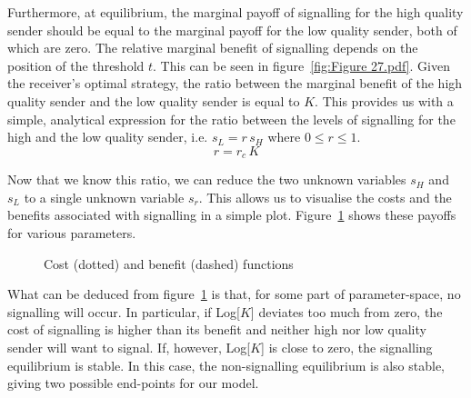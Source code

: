 \documentclass[a4paper,12pt]{article}
\numberwithin{equation}{section}
\begin{document}
Furthermore, at equilibrium, the marginal payoff of signalling for the high quality sender should be equal to the marginal payoff for the low quality sender, both of which are zero. The relative marginal benefit of signalling depends on the position of the threshold $t$. This can be seen in figure~\ref{fig:Figure 27.pdf}. Given the receiver's optimal strategy, the ratio between the marginal benefit of the high quality sender and the low quality sender is equal to $K$. This provides us with a simple, analytical expression for the ratio between the levels of signalling for the high and the low quality sender, i.e. $s_{L}=r \,s_{H}$ where $0 \leq r \leq 1$.
\begin{equation}
\label{eq:SignalDetectionModel/Ratio}
r=r_{c} \, K
\end{equation}

Now that we know this ratio, we can reduce the two unknown variables $s_{H}$ and $s_{L}$ to a single unknown variable $s_{r}$. This allows us to visualise the costs and the benefits associated with signalling in a simple plot. Figure~\ref{fig:Figure 202122} shows these payoffs for various parameters.
\begin{figure}[!h]
\begin{center}
\hspace{1mm}
\hspace{1mm}
\caption{Cost (dotted) and benefit (dashed) functions}
\label{fig:Figure 202122}
\end{center}
\end{figure}

What can be deduced from figure~\ref{fig:Figure 202122} is that, for some part of parameter-space, no signalling will occur. In particular, if Log[$K$] deviates too much from zero, the cost of signalling is higher than its benefit and neither high nor low quality sender will want to signal. If, however, Log[$K$] is close to zero, the signalling equilibrium is stable. In this case, the non-signalling equilibrium is also stable, giving two possible end-points for our model.
\end{document}
